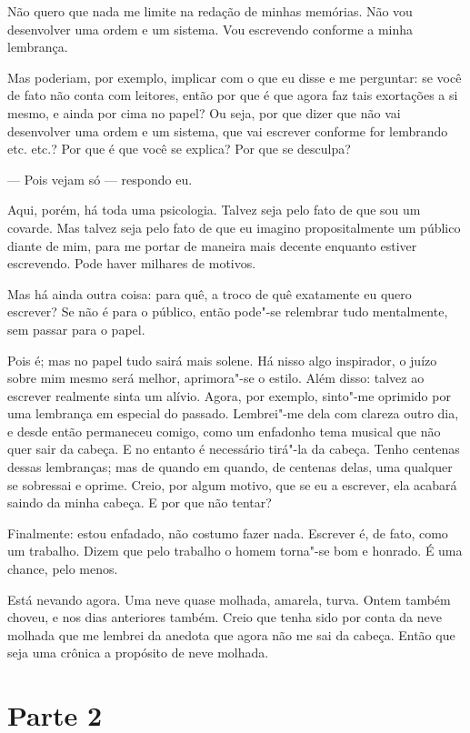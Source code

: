 Não quero que nada me limite na redação de minhas memórias. Não vou
desenvolver uma ordem e um sistema. Vou escrevendo conforme a minha lembrança.

Mas poderiam, por exemplo, implicar com o que eu disse e me perguntar:
se você de fato não conta com leitores, então por que é que agora faz
tais exortações a si mesmo, e ainda por cima no papel? Ou seja, por que
dizer que não vai desenvolver uma ordem e um sistema, que vai escrever
conforme for lembrando etc. etc.? Por que é que você se explica? Por que se
desculpa?

--- Pois vejam só --- respondo eu.

Aqui, porém, há toda uma psicologia. Talvez seja pelo fato de que sou um
covarde. Mas talvez seja pelo fato de que eu imagino propositalmente um
público diante de mim, para me portar de maneira mais decente enquanto
estiver escrevendo. Pode haver milhares de motivos.

Mas há ainda outra coisa: para quê, a troco de quê exatamente eu quero
escrever? Se não é para o público, então pode"-se relembrar tudo
mentalmente, sem passar para o papel.

Pois é; mas no papel tudo sairá mais solene. Há nisso algo inspirador, o
juízo sobre mim mesmo será melhor, aprimora"-se o estilo. Além disso:
talvez ao escrever realmente sinta um alívio. Agora, por exemplo,
sinto"-me oprimido por uma lembrança em especial do passado. Lembrei"-me
dela com clareza outro dia, e desde então permaneceu comigo, como um
enfadonho tema musical que não quer sair da cabeça. E no entanto é
necessário tirá"-la da cabeça. Tenho centenas dessas lembranças; mas de
quando em quando, de centenas delas, uma qualquer se sobressai e
oprime. Creio, por algum motivo, que se eu a escrever, ela acabará
saindo da minha cabeça. E por que não tentar?

Finalmente: estou enfadado, não costumo fazer nada. Escrever é, de fato,
como um trabalho. Dizem que pelo trabalho o homem torna"-se bom e
honrado. É uma chance, pelo menos.

Está nevando agora. Uma neve quase molhada, amarela, turva. Ontem também
choveu, e nos dias anteriores também. Creio que tenha sido por conta da
neve molhada que me lembrei da anedota que agora não me sai da cabeça.
Então que seja uma crônica a propósito de neve molhada.

\part{Parte 2}


